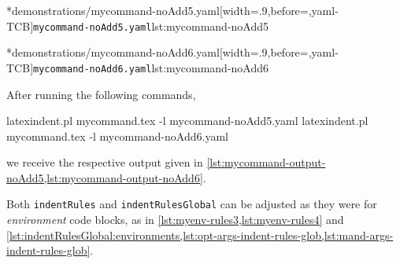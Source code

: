 	\begin{minipage}{.45\textwidth}
		\cmhlistingsfromfile[style=yaml-LST]*{demonstrations/mycommand-noAdd5.yaml}[width=.9\linewidth,before=\centering,yaml-TCB]{\texttt{mycommand-noAdd5.yaml}}{lst:mycommand-noAdd5}
	\end{minipage}
	\hfill
	\begin{minipage}{.45\textwidth}
		\cmhlistingsfromfile[style=yaml-LST]*{demonstrations/mycommand-noAdd6.yaml}[width=.9\linewidth,before=\centering,yaml-TCB]{\texttt{mycommand-noAdd6.yaml}}{lst:mycommand-noAdd6}
	\end{minipage}

	After running the following commands, \begin{commandshell}
latexindent.pl mycommand.tex -l mycommand-noAdd5.yaml  
latexindent.pl mycommand.tex -l mycommand-noAdd6.yaml  
\end{commandshell} we receive the respective output given in \cref{lst:mycommand-output-noAdd5,lst:mycommand-output-noAdd6}.

	\begin{minipage}{.45\textwidth}
	\end{minipage}
	\hfill
	\begin{minipage}{.45\textwidth}
	\end{minipage}

	Both \texttt{indentRules} and \texttt{indentRulesGlobal} can be adjusted as they were for \emph{environment} code blocks, as in \vref{lst:myenv-rules3,lst:myenv-rules4} and \vref{lst:indentRulesGlobal:environments,lst:opt-args-indent-rules-glob,lst:mand-args-indent-rules-glob}.
